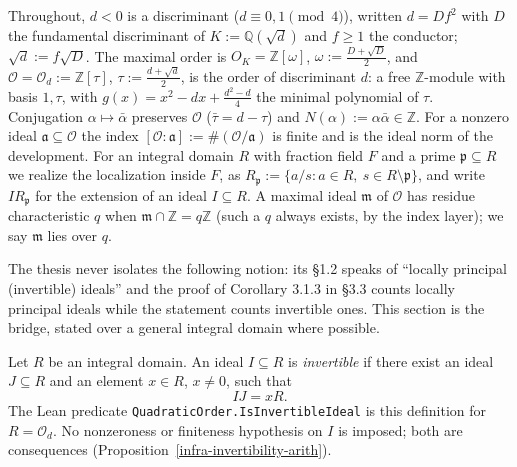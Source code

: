 
Throughout, $d < 0$ is a discriminant ($d \equiv 0, 1 \pmod 4$), written
$d = D f^2$ with $D$ the fundamental discriminant of $K := \mathbb{Q}(\sqrt d)$
and $f \geq 1$ the conductor; $\sqrt d := f \sqrt D$. The maximal order is
$O_K = \mathbb{Z}[\omega]$, $\omega := \tfrac{D + \sqrt D}{2}$, and
$\mathcal{O} = \mathcal{O}_d := \mathbb{Z}[\tau]$, $\tau := \tfrac{d + \sqrt d}{2}$,
is the order of discriminant $d$: a free $\mathbb{Z}$-module with basis
$1, \tau$, with $g(x) = x^2 - dx + \tfrac{d^2 - d}{4}$ the minimal polynomial of
$\tau$. Conjugation $\alpha \mapsto \bar\alpha$ preserves $\mathcal{O}$
($\bar\tau = d - \tau$) and $N(\alpha) := \alpha \bar\alpha \in \mathbb{Z}$.
For a nonzero ideal $\mathfrak{a} \subseteq \mathcal{O}$ the index
$[\mathcal{O} : \mathfrak{a}] := \#(\mathcal{O}/\mathfrak{a})$ is finite and is
the ideal norm of the development. For an integral domain $R$ with fraction
field $F$ and a prime $\mathfrak{p} \subseteq R$ we realize the localization
inside $F$, as $R_{\mathfrak{p}} := \{ a/s : a \in R, \ s \in R \setminus \mathfrak{p} \}$,
and write $I R_{\mathfrak{p}}$ for the extension of an ideal $I \subseteq R$.
A maximal ideal $\mathfrak{m}$ of $\mathcal{O}$ has residue characteristic $q$
when $\mathfrak{m} \cap \mathbb{Z} = q\mathbb{Z}$ (such a $q$ always exists, by
the index layer); we say $\mathfrak{m}$ lies over $q$.

The thesis never isolates the following notion: its \S 1.2 speaks of ``locally
principal (invertible) ideals'' and the proof of Corollary 3.1.3 in \S 3.3
counts locally principal ideals while the statement counts invertible ones.
This section is the bridge, stated over a general integral domain where
possible.

\begin{definition}\label{infra-invertibility-def}
  Let $R$ be an integral domain. An ideal $I \subseteq R$ is \emph{invertible}
  if there exist an ideal $J \subseteq R$ and an element $x \in R$, $x \neq 0$,
  such that
  \[ I J = x R . \]
  The Lean predicate \texttt{QuadraticOrder.IsInvertibleIdeal} is this
  definition for $R = \mathcal{O}_d$. No nonzeroness or finiteness hypothesis
  on $I$ is imposed; both are consequences
  (Proposition~\ref{infra-invertibility-arith}).
\end{definition}


